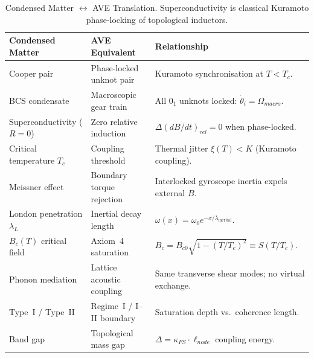 %

\begin{table}[H]
\centering
\caption{Condensed Matter $\leftrightarrow$ AVE Translation.  Superconductivity is classical Kuramoto phase-locking of topological inductors.}
\label{tab:trans_condensed}
\small
\renewcommand{\arraystretch}{1.3}
\begin{tabular}{@{}p{3.8cm} p{4.0cm} p{5.8cm}@{}}
\toprule
\textbf{Condensed Matter} & \textbf{AVE Equivalent} & \textbf{Relationship} \\
\midrule
Cooper pair & Phase-locked unknot pair & Kuramoto synchronisation at $T < T_c$. \\
BCS condensate & Macroscopic gear train & All $0_1$ unknots locked: $\dot{\theta}_i = \Omega_{macro}$. \\
Superconductivity ($R=0$) & Zero relative induction & $\Delta(dB/dt)_{rel} = 0$ when phase-locked. \\
Critical temperature $T_c$ & Coupling threshold & Thermal jitter $\xi(T) < K$ (Kuramoto coupling). \\
Meissner effect & Boundary torque rejection & Interlocked gyroscope inertia expels external $B$. \\
London penetration $\lambda_L$ & Inertial decay length & $\omega(x) = \omega_0 e^{-x/\lambda_\text{inertial}}$. \\
$B_c(T)$ critical field & Axiom~4 saturation & $B_c = B_{c0}\sqrt{1-(T/T_c)^2} \equiv S(T/T_c)$. \\
Phonon mediation & Lattice acoustic coupling & Same transverse shear modes; no virtual exchange. \\
Type~I / Type~II & Regime~I / I--II boundary & Saturation depth vs.\ coherence length. \\
Band gap & Topological mass gap & $\Delta = \kappa_{FS} \cdot \ell_{node}$ coupling energy. \\
\bottomrule
\end{tabular}
\end{table}
